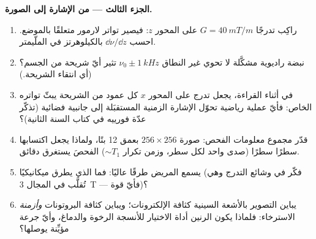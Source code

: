 \begin{problem}
\medskip\noindent\textbf{الجزء الثالث --- من الإشارة إلى الصورة.}
\begin{enumerate}[resume]
  \item راكِب تدرجًا $G = \qty{40}{mT/m}$ على المحور $z$: فيصير
        تواتر لارمور متعلقًا بالموضع. احسب
        $\dd\nu/\dd z$ بالكيلوهرتز في الملّيمتر.
  \item نبضة راديوية مشكَّلة لا تحوي غير النطاق $\nu_0 \pm
        \qty{1}{kHz}$ تثير أيّ شريحة من الجسم؟ (أي انتقاء
        الشريحة.)
  \item في أثناء القراءة، يجعل تدرج على المحور $x$ كل عمود من
        الشريحة يبثّ تواتره الخاص: فأيّ عملية رياضية
        تحوّل الإشارة الزمنية المستقبَلة إلى جانبية فضائية
        (تذكّر عدّة فورييه في كتاب السنة الثانية)؟
  \item قدّر مجموع معلومات الفحص: صورة $256 \times 256$
        بعمق 12 بتًا، ولماذا يجعل اكتسابها سطرًا سطرًا
        (صدى واحد لكل سطر، وزمن تكرار $\sim T_1$) الفحصَ
        يستغرق دقائق.
  \item يسمع المريض طرقًا عاليًا: فما الذي يطرق
        ميكانيكيًا (فكّر في وشائع التدرج وهي تُقلَّب في المجال
        \qty{3}{T} --- فأيّ قوة)؟
  \item يباين التصوير بالأشعة السينية كثافة الإلكترونات؛ ويباين  كثافة البروتونات \emph{وأزمنة} الاسترخاء: فلماذا يكون
        الرنين أداة الاختيار للأنسجة الرخوة والدماغ، وأيّ جرعة
        مؤيِّنة يوصلها؟
\end{enumerate}


\end{problem}
